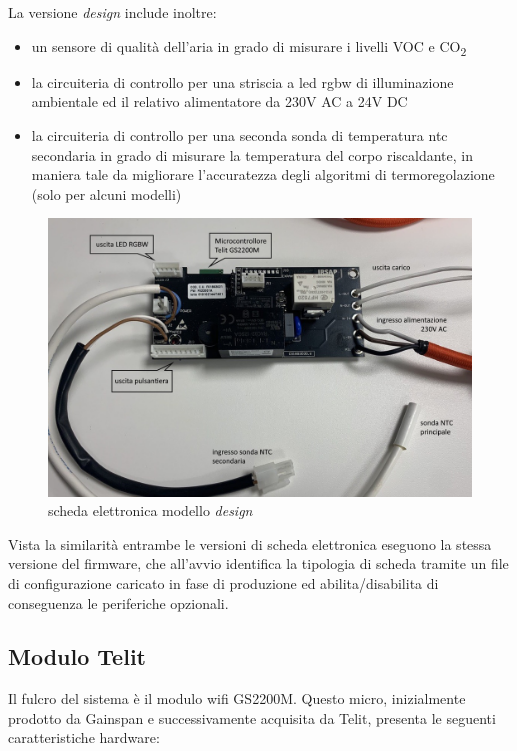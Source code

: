 \documentclass[12pt,a4paper,twoside,titlepage]{book}
\begin{document}
La versione \textit{design} include inoltre:
\begin{itemize}
    \item un sensore di qualità dell'aria in grado di misurare i livelli VOC e CO\textsubscript{2}
    \item la circuiteria di controllo per una striscia a \acrshort{led} \acrshort{rgbw} di illuminazione ambientale
        ed il relativo alimentatore da 230V AC a 24V DC
    \item la circuiteria di controllo per una seconda sonda di temperatura \acrshort{ntc} secondaria in grado di
        misurare la temperatura del corpo riscaldante, in maniera tale da migliorare
        l'accuratezza degli algoritmi di termoregolazione (solo per alcuni modelli)
\end{itemize}

\begin{figure}
    \centering
    \includegraphics[width=\textwidth]{img/scheda-design.jpg}
    \caption{scheda elettronica modello \textit{design}}
    \label{fig:schedadesign}
\end{figure}
    
Vista la similarità entrambe le versioni di scheda elettronica eseguono la stessa versione del \gls{firmware},
che all'avvio identifica la tipologia di scheda tramite un file di configurazione caricato in fase di produzione
ed abilita/disabilita di conseguenza le periferiche opzionali. 

\subsection{Modulo Telit}

Il fulcro del sistema è il modulo \Gls{wifi} GS2200M. Questo \gls{micro}, inizialmente
prodotto da Gainspan e successivamente acquisita da Telit, presenta le seguenti
caratteristiche hardware:
\end{document}
